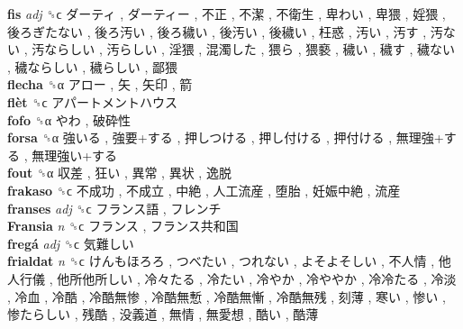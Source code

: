 \textbf{fis} \emph{adj}  ␝ϲ   ダーティ ,  ダーティー ,  不正 ,  不潔 ,  不衛生 ,  卑わい ,  卑猥 ,  婬猥 ,  後ろぎたない ,  後ろ汚い ,  後ろ穢い ,  後汚い ,  後穢い ,  枉惑 ,  汚い ,  汚す ,  汚ない ,  汚ならしい ,  汚らしい ,  淫猥 ,  混濁した ,  猥ら ,  猥褻 ,  穢い ,  穢す ,  穢ない ,  穢ならしい ,  穢らしい ,  鄙猥   \\
\textbf{flecha} ␝α   アロー ,  矢 ,  矢印 ,  箭   \\
\textbf{flèt} ␝ϲ   アパートメントハウス   \\
\textbf{fofo} ␝α   やわ ,  破砕性   \\
\textbf{forsa} ␝α   強いる ,  強要+する ,  押しつける ,  押し付ける ,  押付ける ,  無理強+する ,  無理強い+する   \\
\textbf{fout} ␝α   収差 ,  狂い ,  異常 ,  異状 ,  逸脱   \\
\textbf{frakaso} ␝ϲ   不成功 ,  不成立 ,  中絶 ,  人工流産 ,  堕胎 ,  妊娠中絶 ,  流産   \\
\textbf{franses} \emph{adj}  ␝ϲ   フランス語 ,  フレンチ   \\
\textbf{Fransia} \emph{n}  ␝ϲ   フランス ,  フランス共和国   \\
\textbf{fregá} \emph{adj}  ␝ϲ   気難しい   \\
\textbf{frialdat} \emph{n}  ␝ϲ   けんもほろろ ,  つべたい ,  つれない ,  よそよそしい ,  不人情 ,  他人行儀 ,  他所他所しい ,  冷々たる ,  冷たい ,  冷やか ,  冷ややか ,  冷冷たる ,  冷淡 ,  冷血 ,  冷酷 ,  冷酷無惨 ,  冷酷無慙 ,  冷酷無慚 ,  冷酷無残 ,  刻薄 ,  寒い ,  惨い ,  惨たらしい ,  残酷 ,  没義道 ,  無情 ,  無愛想 ,  酷い ,  酷薄   \\
